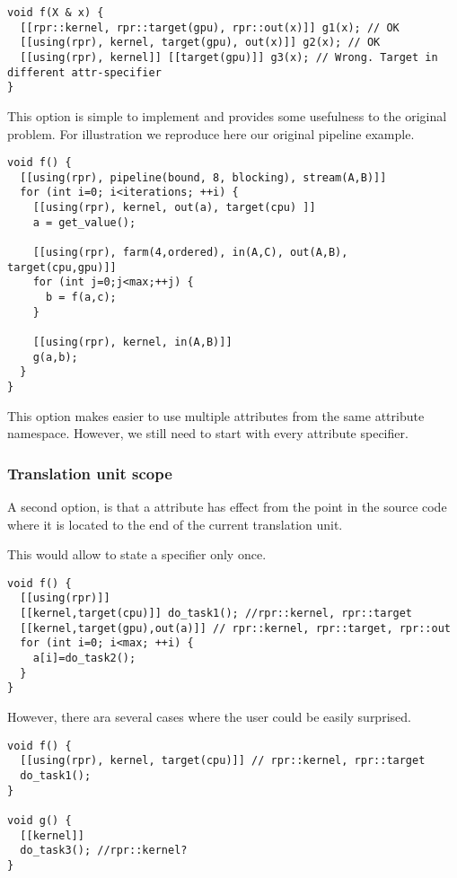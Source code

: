 \begin{lstlisting}
void f(X & x) {
  [[rpr::kernel, rpr::target(gpu), rpr::out(x)]] g1(x); // OK
  [[using(rpr), kernel, target(gpu), out(x)]] g2(x); // OK
  [[using(rpr), kernel]] [[target(gpu)]] g3(x); // Wrong. Target in different attr-specifier
}
\end{lstlisting}

This option is simple to implement and provides some usefulness to the original
problem. For illustration we reproduce here our original pipeline example.

\begin{lstlisting}
void f() {
  [[using(rpr), pipeline(bound, 8, blocking), stream(A,B)]]
  for (int i=0; i<iterations; ++i) {
    [[using(rpr), kernel, out(a), target(cpu) ]]
    a = get_value();
    
    [[using(rpr), farm(4,ordered), in(A,C), out(A,B), target(cpu,gpu)]]
    for (int j=0;j<max;++j) {
      b = f(a,c);
    }

    [[using(rpr), kernel, in(A,B)]]
    g(a,b);
  }
}
\end{lstlisting}

This option makes easier to use multiple attributes from the same attribute
namespace. However, we still need to start with  every attribute
specifier.

\subsubsection{Translation unit scope}

A second option, is that a  attribute has effect from the point
in the source code where it is located to the end of the current translation unit.

This would allow to state a  specifier only once.

\begin{lstlisting}
void f() {
  [[using(rpr)]]
  [[kernel,target(cpu)]] do_task1(); //rpr::kernel, rpr::target
  [[kernel,target(gpu),out(a)]] // rpr::kernel, rpr::target, rpr::out 
  for (int i=0; i<max; ++i) {
    a[i]=do_task2();
  }
}
\end{lstlisting}

However, there ara several cases where the user could be easily surprised.

\begin{lstlisting}
void f() {
  [[using(rpr), kernel, target(cpu)]] // rpr::kernel, rpr::target
  do_task1();
}

void g() {
  [[kernel]]
  do_task3(); //rpr::kernel?
}
\end{lstlisting}

